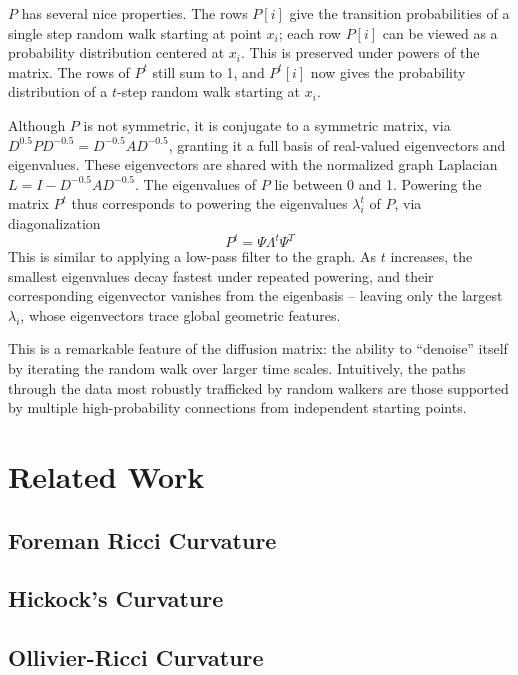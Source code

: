 \documentclass[
  letterpaper,
  DIV=11,
  numbers=noendperiod]{scrartcl}
\theoremstyle{plain}
\theoremstyle{plain}
\theoremstyle{definition}
\theoremstyle{definition}
\theoremstyle{remark}
\begin{document}
\(P\) has several nice properties. The rows \(P[i]\) give the transition
probabilities of a single step random walk starting at point \(x_{i}\);
each row \(P[i]\) can be viewed as a probability distribution centered
at \(x_{i}\). This is preserved under powers of the matrix. The rows of
\(P^t\) still sum to 1, and \(P^t[i]\) now gives the probability
distribution of a \(t\)-step random walk starting at \(x_{i}\).

Although \(P\) is not symmetric, it is conjugate to a symmetric matrix,
via \(D^{0.5}PD^{-0.5} = D^{-0.5}AD^{-0.5}\), granting it a full basis
of real-valued eigenvectors and eigenvalues. These eigenvectors are
shared with the normalized graph Laplacian
\(L = I - D^{-0.5}AD^{-0.5}\). The eigenvalues of \(P\) lie between 0
and 1. Powering the matrix \(P^t\) thus corresponds to powering the
eigenvalues \(\lambda_{i}^t\) of \(P\), via diagonalization \[
P^t = \Psi \Lambda^t \Psi^T
\] This is similar to applying a low-pass filter to the graph. As \(t\)
increases, the smallest eigenvalues decay fastest under repeated
powering, and their corresponding eigenvector vanishes from the
eigenbasis -- leaving only the largest \(\lambda_{i}\), whose
eigenvectors trace global geometric features.

This is a remarkable feature of the diffusion matrix: the ability to
``denoise'' itself by iterating the random walk over larger time scales.
Intuitively, the paths through the data most robustly trafficked by
random walkers are those supported by multiple high-probability
connections from independent starting points.

\section{Related Work}\label{related-work}

\subsection{Foreman Ricci Curvature}\label{foreman-ricci-curvature}

\subsection{Hickock's Curvature}\label{hickocks-curvature}

\subsection{Ollivier-Ricci Curvature}\label{ollivier-ricci-curvature}
\end{document}
